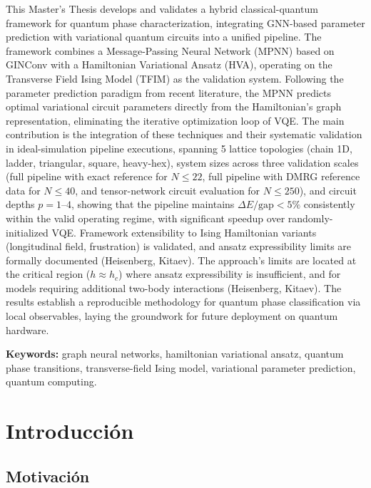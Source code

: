 \documentclass[11pt,a4paper,spanish]{book}
\begin{document}
This Master's Thesis develops and validates a hybrid classical-quantum framework for quantum phase characterization, integrating GNN-based parameter prediction with variational quantum circuits into a unified pipeline. The framework combines a Message-Passing Neural Network (MPNN) based on GINConv with a Hamiltonian Variational Ansatz (HVA), operating on the Transverse Field Ising Model (TFIM) as the validation system. Following the parameter prediction paradigm from recent literature, the MPNN predicts optimal variational circuit parameters directly from the Hamiltonian's graph representation, eliminating the iterative optimization loop of VQE. The main contribution is the integration of these techniques and their systematic validation in ideal-simulation pipeline executions, spanning 5 lattice topologies (chain 1D, ladder, triangular, square, heavy-hex), system sizes across three validation scales (full pipeline with exact reference for $N \leq 22$, full pipeline with DMRG reference data for $N \leq 40$, and tensor-network circuit evaluation for $N \leq 250$), and circuit depths $p = 1$--$4$, showing that the pipeline maintains $\Delta E/\text{gap} < 5\%$ consistently within the valid operating regime, with significant speedup over randomly-initialized VQE. Framework extensibility to Ising Hamiltonian variants (longitudinal field, frustration) is validated, and ansatz expressibility limits are formally documented (Heisenberg, Kitaev). The approach's limits are located at the critical region ($h \approx h_c$) where ansatz expressibility is insufficient, and for models requiring additional two-body interactions (Heisenberg, Kitaev). The results establish a reproducible methodology for quantum phase classification via local observables, laying the groundwork for future deployment on quantum hardware.

\vspace{0.5cm}
{\bf Keywords:} graph neural networks, hamiltonian variational ansatz, quantum phase transitions, transverse-field Ising model, variational parameter prediction, quantum computing.

\mainmatter



\chapter{Introducción}

\section{Motivación}
\end{document}
